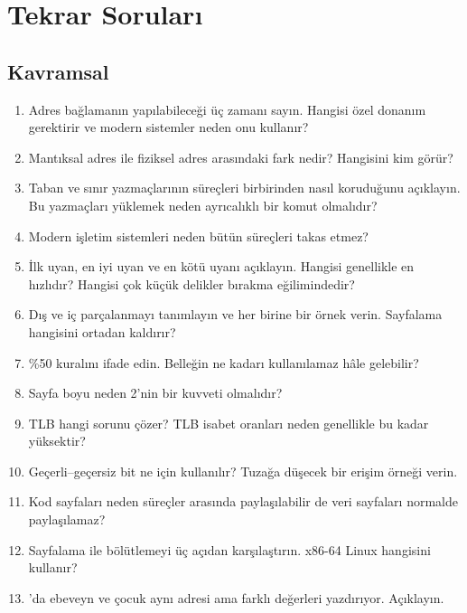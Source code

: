 \section{Tekrar Soruları}

\subsection*{Kavramsal}
\begin{enumerate}[leftmargin=1.6em]
  \item Adres bağlamanın yapılabileceği üç zamanı sayın. Hangisi özel donanım gerektirir ve modern sistemler neden onu kullanır?
  \item Mantıksal adres ile fiziksel adres arasındaki fark nedir? Hangisini kim görür?
  \item Taban ve sınır yazmaçlarının süreçleri birbirinden nasıl koruduğunu açıklayın. Bu yazmaçları yüklemek neden ayrıcalıklı bir komut olmalıdır?
  \item Modern işletim sistemleri neden bütün süreçleri takas etmez?
  \item İlk uyan, en iyi uyan ve en kötü uyanı açıklayın. Hangisi genellikle en hızlıdır? Hangisi çok küçük delikler bırakma eğilimindedir?
  \item Dış ve iç parçalanmayı tanımlayın ve her birine bir örnek verin. Sayfalama hangisini ortadan kaldırır?
  \item \%50 kuralını ifade edin. Belleğin ne kadarı kullanılamaz hâle gelebilir?
  \item Sayfa boyu neden 2'nin bir kuvveti olmalıdır?
  \item TLB hangi sorunu çözer? TLB isabet oranları neden genellikle bu kadar yüksektir?
  \item Geçerli--geçersiz bit ne için kullanılır? Tuzağa düşecek bir erişim örneği verin.
  \item Kod sayfaları neden süreçler arasında paylaşılabilir de veri sayfaları normalde paylaşılamaz?
  \item Sayfalama ile bölütlemeyi üç açıdan karşılaştırın. x86-64 Linux hangisini kullanır?
  \item {}'da ebeveyn ve çocuk aynı adresi ama farklı değerleri yazdırıyor. Açıklayın.
\end{enumerate}

